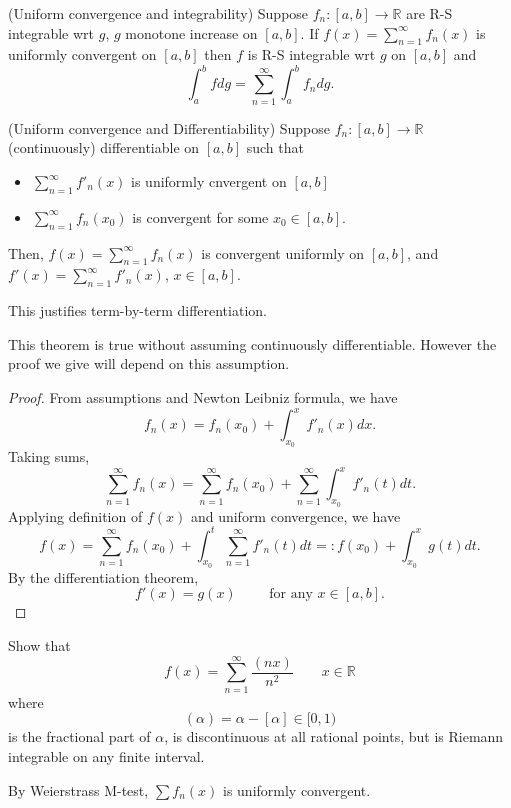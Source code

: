 
\begin{theorem}(Uniform convergence and integrability)
	Suppose $f_n: [a,b] \to \mathbb{R}$ are R-S integrable wrt $g$, $g$ monotone increase on $[a,b]$. If $f(x) = \sum_{n=1}^{\infty} f_n(x)$ is uniformly convergent on $[a,b]$ then $f$ is R-S integrable wrt $g$ on $[a,b]$ and 
	\[
		\int _a^b f dg = \sum_{n=1}^{\infty} \int _a^b f_n dg
	.\] 
\end{theorem}

\begin{theorem}(Uniform convergence and Differentiability)
	Suppose $f_n: [a,b] \to \mathbb{R}$ (continuously) differentiable on $[a,b]$ such that 
	\begin{itemize}
		\item $\sum_{n=1}^{\infty} f'_n(x)$ is uniformly cnvergent on $[a,b]$
		\item  $\sum_{n=1}^{\infty} f_n(x_0)$ is convergent for some $x_0 \in [a,b]$.
	\end{itemize}
	Then, $f(x) = \sum_{n=1}^{\infty} f_n(x)$ is convergent uniformly on $[a,b]$, and $f'(x) = \sum_{n=1}^{\infty} f'_n(x)$, $x \in [a,b]$.
\end{theorem}
This justifies term-by-term differentiation.

\begin{remark}
	This theorem is true without assuming continuously differentiable. However the proof we give will depend on this assumption.
\end{remark}

\begin{proof}
	From assumptions and Newton Leibniz formula, we have
	\[
		f_n(x) = f_n(x_0) + \int _{x_0}^x f'_n(x) dx
	.\] 
	Taking sums,
	\[
		\sum_{n=1}^{\infty} f_n(x) = \sum_{n=1}^{\infty} f_n(x_0) + \sum_{n=1}^{\infty} \int _{x_0}^x f'_n(t) dt
	.\] 
	Applying definition of $f(x)$ and uniform convergence, we have
	\[
		f(x) = \sum_{n=1}^{\infty} f_n(x_0) + \int _{x_0}^t \sum_{n=1}^{\infty}f'_n(t)dt 
		=:  f(x_0) + \int _{x_0}^x g(t) dt
	.\] 
	By the differentiation theorem,
	\[
		f'(x) = g(x) \qquad 
		\text{ for any }  x \in [a,b]
	.\] 
\end{proof}

\begin{example}
	Show that
	\[
		f(x) = \sum_{n=1}^{\infty} \frac{(nx) }{n^2}
		\qquad x \in \mathbb{R}
	\] 
	where
	\[
		(\alpha) = \alpha - [\alpha] \in [0,1)
	\]
	is the fractional part of $\alpha$,
	is discontinuous at all rational points, but is Riemann integrable on any finite interval.
\end{example}
	By Weierstrass M-test, $\sum f_n(x)$ is uniformly convergent. 

